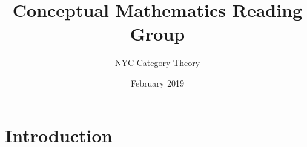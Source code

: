 \documentclass{article}
\title{Conceptual Mathematics Reading Group}
\author{ NYC Category Theory }
\date{February 2019}
\begin{document}
\maketitle

\section{Introduction}
\end{document}
